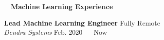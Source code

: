 \documentclass[a4paper,12pt]{article}
\newcommand{\resheading}[1]{{\hspace{-9pt} \colorbox{mygrey}{\begin{minipage}{\textwidth}{\textmd{~~\large \textbf{#1} \vphantom{p\^{E}}}}\end{minipage}}\vspace{6pt}} }
\newcommand{\ressubheading}[4]{{\begin{minipage}{\textwidth}
                                    \textbf{#1} \hfill #2 \\
                                    \textit{#3} \hfill #4 \\
\end{minipage}}}
\begin{document}
    \resheading{Machine Learning Experience}

% 
% 

    \ressubheading{Lead Machine Learning Engineer}{Fully Remote}{Dendra Systems}{Feb. 2020 --- Now}
\end{document}
